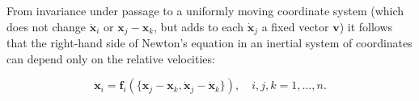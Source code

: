 From invariance under passage to a uniformly moving coordinate system (which does not change $\ddot{\mathbf{x}}_i$ or $\mathbf{x}_j - \mathbf{x}_k$, but adds to each $\dot{\mathbf{x}}_j$ a fixed vector $\mathbf{v}$) it follows that the right-hand side of Newton's equation in an inertial system of coordinates can depend only on the relative velocities:

$$\ddot{\mathbf{x}}_i = \mathbf{f}_i(\{\mathbf{x}_j - \mathbf{x}_k, \dot{\mathbf{x}}_j - \dot{\mathbf{x}}_k\}), \quad i, j, k = 1, \ldots, n.$$
